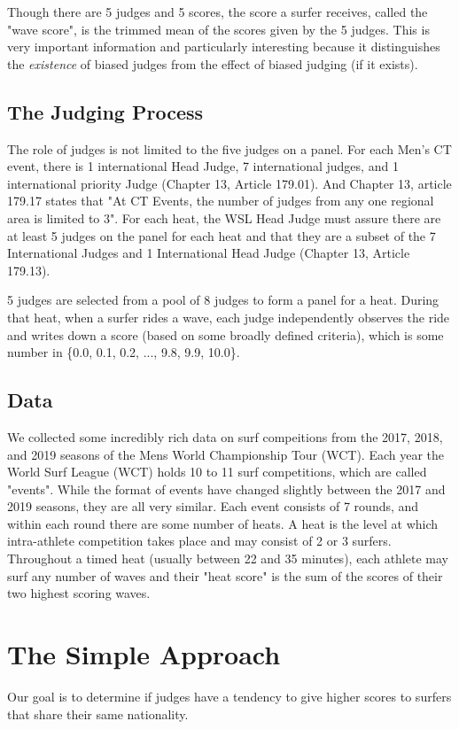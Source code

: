 \documentclass[12pt,a4paper]{article}
\begin{document}
Though there are 5 judges and 5 scores, the score a surfer receives, called the "wave score", is the trimmed mean of the scores given by the 5 judges. This is very important information and particularly interesting because it distinguishes the \emph{existence} of biased judges from the effect of biased judging (if it exists).


\subsection{The Judging Process}
The role of judges is not limited to the five judges on a panel. For each Men's CT event, there is 1 international Head Judge, 7 international judges, and 1 international priority Judge (Chapter 13, Article 179.01). And Chapter 13, article 179.17 states that "At CT Events, the number of judges from any one regional area is limited to 3". For each heat, the WSL Head Judge must assure there are at least 5 judges on the panel for each heat and that they are a subset of the 7 International Judges and 1 International Head Judge (Chapter 13, Article 179.13).


5 judges are selected from a pool of 8 judges to form a panel for a heat. During that heat, when a surfer rides a wave, each judge independently observes the ride and writes down a score (based on some broadly defined criteria), which is some number in \{0.0, 0.1, 0.2, ..., 9.8, 9.9, 10.0\}.


\subsection{Data}
We collected some incredibly rich data on surf compeitions from the 2017, 2018, and 2019 seasons of the Mens World Championship Tour (WCT). Each year the World Surf League (WCT) holds 10 to 11 surf competitions, which are called "events". While the format of events have changed slightly between the 2017 and 2019 seasons, they are all very similar. Each event consists of 7 rounds, and within each round there are some number of heats. A heat is the level at which intra-athlete competition takes place and may consist of 2 or 3 surfers. Throughout a timed heat (usually between 22 and 35 minutes), each athlete may surf any number of waves and their "heat score" is the sum of the scores of their two highest scoring waves. 


\section{The Simple Approach}
Our goal is to determine if judges have a tendency to give higher scores to surfers that share their same nationality.
\end{document}
